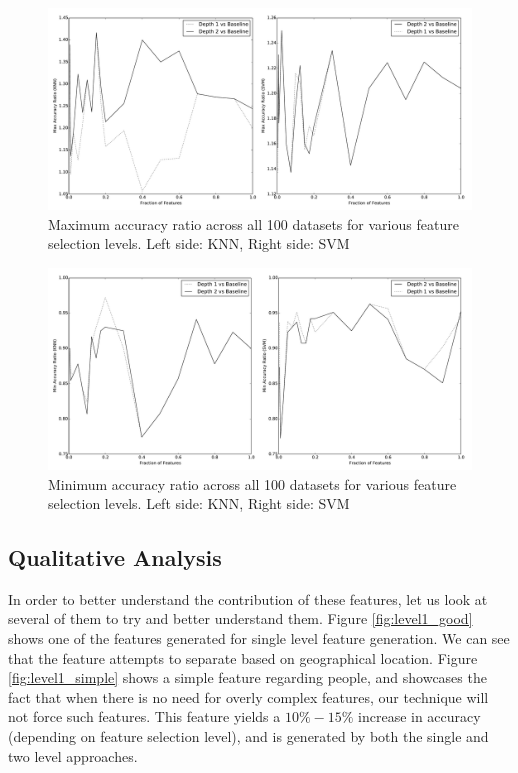\documentclass{article}
\theoremstyle{definition}
\begin{document}
\begin{figure}[H]
	\centering
	\includegraphics[width=\linewidth]{ratios_max2.pdf}
	\caption{Maximum accuracy ratio across all 100 datasets for various feature selection levels. Left side: KNN, Right side: SVM}
	\label{fig:ratios_max}
\end{figure}

\begin{figure}[H]
	\centering
	\includegraphics[width=\linewidth]{ratios_min2.pdf}
	\caption{Minimum accuracy ratio across all 100 datasets for various feature selection levels. Left side: KNN, Right side: SVM}
	\label{fig:ratios_min}
\end{figure}


\subsection{Qualitative Analysis}
In order to better understand the contribution of these features, let us look at several of them to try and better understand them. Figure \ref{fig:level1_good} shows one of the features generated for single level feature generation. We can see that the feature attempts to separate based on geographical location. Figure \ref{fig:level1_simple} shows a simple feature regarding people, and showcases the fact that when there is no need for overly complex features, our technique will not force such features. This feature yields a $10\%-15\%$ increase in accuracy (depending on feature selection level), and is generated by both the single and two level approaches.
\end{document}
